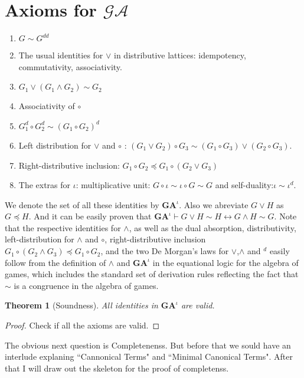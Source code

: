 \documentclass[10pt]{article}
\newcommand{\ga}{\mathcal{GA}}
\newcommand{\id}{\iota}
\newcommand{\cle}{\preccurlyeq}
\newtheorem{theorem}{Theorem}
\begin{document}
	\section{Axioms for $\ga$}
	\begin{enumerate}
		\item $G \sim G^{dd}$
		\item The usual identities for $\lor$ in distributive lattices: idempotency, commutativity, associativity.
		\item $G_1 \lor (G_1\land G_2) \sim G_2$
		\item  Associativity of $\circ$
		\item $G_1^d \circ G_2^d \sim (G_1 \circ G_2)^d $
		\item Left distribution for $\lor$ and $\circ$ : $(G_1 \lor G_2)\circ G_3 \sim (G_1 \circ G_3) \lor (G_2 \circ G_3)$.
		\item Right-distributive inclusion: $G_1 \circ G_2 \cle G_1 \circ(G_2 \lor G_3)$
		\item The extras for $\iota$: multiplicative unit: $G\circ \iota \sim \iota \circ G\sim G$ and self-duality:$\iota \sim  \iota^d$.
	\end{enumerate}
	
	We denote the set of all these identities by $\textbf{GA}^\iota$. Also we abreviate $G\lor H$ as $G\cle H$. And it can be easily proven that $\textbf{GA}^\id \vdash G\lor H \sim H \leftrightarrow G \land H \sim G$.
	Note that the respective identities for $\land$, as well as the dual absorption,
	distributivity, left-distribution for $\land$ and $\circ$, right-distributive inclusion $G_1\circ(G_2\land G_3) \cle G_1 \circ G_2$, and the two De Morgan’s laws for $\lor$,$\land$ and $ ^d$ easily follow from the definition of $\land$ and $\textbf{GA}^\iota$ in the equational logic for the algebra of games, which includes the standard set of derivation rules reflecting the fact that $\sim$ is a congruence in the algebra of games.
	
	\begin{theorem}[Soundness]\label{th4}
		All identities in $\textbf{GA}^\iota$ are valid.
	\end{theorem}
	\begin{proof}
		Check if all the axioms are valid.
	\end{proof}
	
	The obvious next question is Completenenss. But before that we sould have an interlude explaning ``Cannonical Terms" and ``Minimal Canonical Terms". After that I will draw out the skeleton for the proof of completenss.
	
\end{document}
